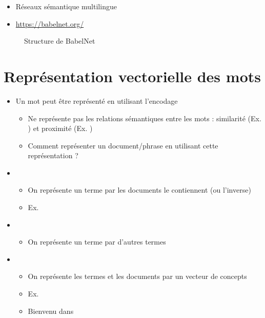\documentclass{KodeBook}
\begin{document}
\begin{itemize}
	\item Réseaux sémantique multilingue
	\item \url{https://babelnet.org/}
\end{itemize}

\begin{figure}
	\caption{Structure de BabelNet \cite{2012-navigli-ponzetto}}
\end{figure}

\section{Représentation vectorielle des mots}

\begin{itemize}
	\item Un mot peut être représenté en utilisant l'encodage  
	\begin{itemize}
		\item Ne représente pas les relations sémantiques entre les mots : similarité (Ex. ) et proximité (Ex. )
		\item Comment représenter un document/phrase en utilisant cette représentation ?
	\end{itemize}
	
	\item {}
	\begin{itemize}
		\item On représente un terme par les documents le contiennent (ou l'inverse)
		\item Ex. 
	\end{itemize}
	
	\item {}
	\begin{itemize}
		\item On représente un terme par d'autres termes
	\end{itemize}
	
	\item {}
	\begin{itemize}
		\item On représente les termes et les documents par un vecteur de concepts
		\item Ex. 
		\item Bienvenu dans 
	\end{itemize}
	
\end{itemize}
\end{document}

